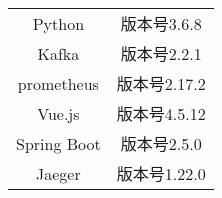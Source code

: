 \begin{table}[htbp]
\begin{tabular}{cc}
    Python                     & 版本号3.6.8                                                                                                                                    \\
    Kafka                      & 版本号2.2.1                                                                                                                                    \\
    prometheus                 & 版本号2.17.2    \\
    Vue.js                     & 版本号4.5.12    \\
    Spring Boot                & 版本号2.5.0    \\
    \multicolumn{1}{c}{Jaeger} & 版本号1.22.0                                                                                                                                   \\ \bottomrule[1.5pt]
    \end{tabular}
\end{table}

